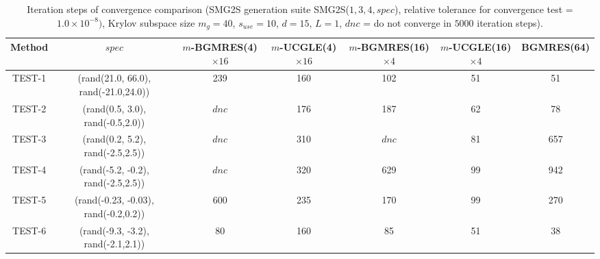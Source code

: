 \begin{table} %
	\footnotesize
	\caption{Iteration steps of convergence comparison (SMG2S generation suite SMG2S($1,3,4, spec$), relative tolerance for convergence test = $1.0\times10^{-8})$, Krylov subspace size $m_g = 40$, $s_{use} = 10$, $d=15$, $L = 1$, $dnc$ = do not converge in $5000$ iteration steps).}
	\centering
	\renewcommand{\arraystretch}{1.6}
	\begin{tabular}{c*{6}{c}}
		\toprule
		Method            & $spec$ & $m$-BGMRES(4)$\times 16$  & $m$-UCGLE(4)$\times 16$   &  $m$-BGMRES(16)$\times 4$ &  $m$-UCGLE(16)$\times 4$ &  BGMRES(64) \\
		\hline
		TEST-1 &(rand(21.0, 66.0), rand(-21.0,24.0))& \cellcolor{blue!20}239 & 160 & 102 & \cellcolor{red!20}51 & \cellcolor{red!20}51\\
		TEST-2   &   (rand(0.5, 3.0), rand(-0.5,2.0))      &\cellcolor{blue!20}$dnc$  & 176 & 187 & \cellcolor{red!20}62 & 78 \\
		TEST-3    &     (rand(0.2, 5.2), rand(-2.5,2.5))    & \cellcolor{blue!20}$dnc$  & 310 & \cellcolor{blue!20}$dnc$  & \cellcolor{red!20}81 &657 \\
		TEST-4    & (rand(-5.2, -0.2), rand(-2.5,2.5))  & \cellcolor{blue!20}$dnc$  & 320 & 629 & \cellcolor{red!20}99 & 942\\
		TEST-5    &  (rand(-0.23, -0.03), rand(-0.2,0.2))  &\cellcolor{blue!20} 600 & 235 & 170 &\cellcolor{red!20} 99 & 270 \\
		TEST-6    &  (rand(-9.3, -3.2), rand(-2.1,2.1))  & 80 & \cellcolor{blue!20}160 & 85 & 51 & \cellcolor{red!20}38 \\
		\hline
	\end{tabular}
	
	\vspace{5\baselineskip}
	

\end{table}
